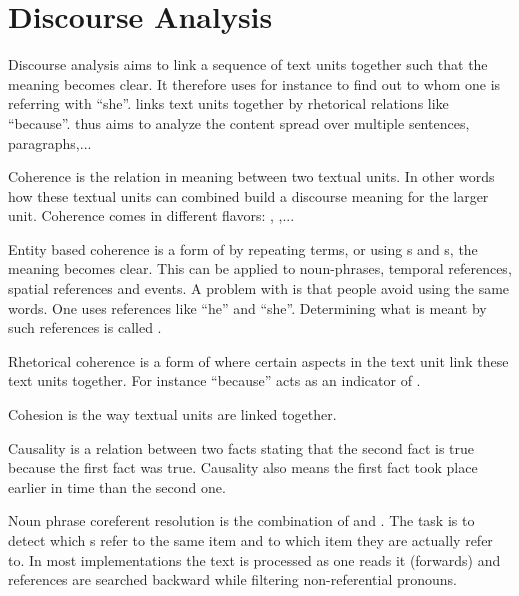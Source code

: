 \section{Discourse Analysis}
\begin{df}{Discourse analysis}
\sb{} aims to link a sequence of text units together such that the meaning becomes clear. It therefore uses for instance  to find out to whom one is referring with ``she''.  links text units together by rhetorical relations like ``because''. \sb{} thus aims to analyze the content spread over multiple sentences, paragraphs,...
\end{df}
\begin{df}{Coherence}
\sb{} is the relation in meaning between two textual units. In other words how these textual units can combined build a discourse meaning for the larger unit. Coherence comes in different flavors: , ,...
\end{df}
\begin{df}{Entity based coherence}
\sb{} is a form of  by repeating terms, or using s and s, the meaning becomes clear. This can be applied to noun-phrases, temporal references, spatial references and events. A problem with \sb{} is that people avoid using the same words. One uses references like ``he'' and ``she''. Determining what is meant by such references is called .
\end{df}
\begin{df}{Rhetorical coherence}
\sb{} is a form of  where certain aspects in the text unit link these text units together. For instance ``because'' acts as an indicator of .
\end{df}
\begin{df}{Cohesion}
\sb{} is the way textual units are linked together.
\end{df}
\begin{df}{Causality}
\sb{} is a relation between two facts stating that the second fact is true because the first fact was true. Causality also means the first fact took place earlier in time than the second one.
\end{df}
\begin{df}{Noun phrase coreferent resolution}
\sb{} is the combination of  and . The task is to detect which s refer to the same item and to which item they are actually refer to. In most implementations the text is processed as one reads it (forwards) and references are searched backward while filtering non-referential pronouns.
\end{df}
